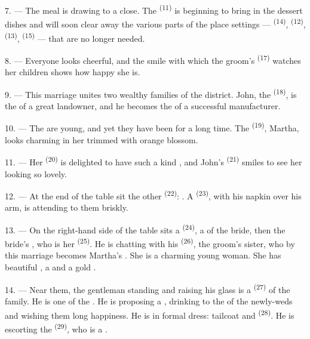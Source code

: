 7. --- The meal is drawing to a close. The  \textsuperscript{(11)} is
beginning to bring in the dessert dishes and will soon clear away the various parts of the
place settings ---  \textsuperscript{(14)},
 \textsuperscript{(12)},  \textsuperscript{(13)},
 \textsuperscript{(15)} --- that are no longer needed.

\VUsaut{3.0mm}

8. --- Everyone looks cheerful, and the smile with which the groom's
 \textsuperscript{(17)} watches her children shows how happy she is.

9. --- This marriage unites two wealthy families of the district. John, the 
\textsuperscript{(18)}, is the  of a great landowner, and he becomes the
 of a successful manufacturer.

10. --- The  are young, and yet they have been
 for a long time. The  \textsuperscript{(19)},
Martha, looks charming in her  trimmed with orange blossom.

11. --- Her  \textsuperscript{(20)} is delighted to have such a kind
, and John's  \textsuperscript{(21)} smiles to
see her  looking so lovely.

12. --- At the end of the table sit the other  \textsuperscript{(22)}:
. A  \textsuperscript{(23)}, with his
napkin over his arm, is attending to them briskly.

\VUsaut{3.0mm}

13. --- On the right-hand side of the table sits a  \textsuperscript{(24)},
a  of the bride, then the bride's
, who is her  \textsuperscript{(25)}. He is chatting
with his  \textsuperscript{(26)}, the groom's sister, who by this marriage
becomes Martha's . She is a charming young woman. She has beautiful
, a  and a gold .

14. --- Near them, the gentleman standing and raising his glass is a
 \textsuperscript{(27)} of the family. He is one of the
. He is proposing a , drinking to
the  of the newly-weds and wishing them long happiness. He is in formal dress:
tailcoat and  \textsuperscript{(28)}. He is escorting the
 \textsuperscript{(29)}, who is a .

